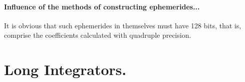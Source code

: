 \paragraph{Influence of the methods of constructing ephemerides...}
It is obvious that such ephemerides in themselves must have 128 bits, that is, comprise the coefficients calculated with quadruple precision.


\section{Long Integrators.}

